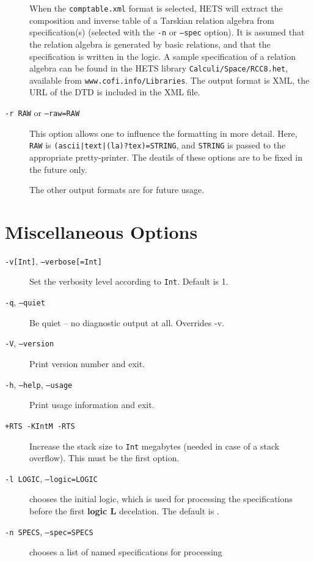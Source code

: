 \documentclass{article}
\newcommand{\normalTEXTSC}[2]{{#1\scriptsize#2}}
\newcommand     {\Hets}{\normalTEXTSC{H}{ETS}\xspace}
\begin{document}
\begin{description}
When the \texttt{comptable.xml} format is selected, \Hets will extract
the composition and inverse table of a Tarskian relation algebra from
specification(s) (selected with the \texttt{-n} or \texttt{--spec}
option). It is assumed that the relation algebra is
generated by basic relations, and that the specification is written
in the \CASL logic. A sample specification of a relation
algebra can be found in the \Hets library \texttt{Calculi/Space/RCC8.het},
available from \texttt{www.cofi.info/Libraries}.
The output format is XML, the URL of the DTD is included in the
XML file.

\item[\texttt{-r RAW} or \texttt{--raw=RAW}] This option  allows one
to influence the formatting in more detail.
Here, \texttt{RAW} is \texttt{(ascii|text|(la)?tex)=STRING},
and \texttt{STRING} is passed to the appropriate pretty-printer.
The deatils of these options are to be fixed in the future only.

The other output formats are for future usage.
\end{description}

\section{Miscellaneous Options}

\begin{description}
\item[\texttt{-v[Int]}, \texttt{--verbose[=Int]}] 
Set the verbosity level according to \texttt{Int}. Default is 1.
\item[\texttt{-q}, \texttt{--quiet}] 
Be quiet -- no diagnostic output at all. Overrides -v.
\item[\texttt{-V}, \texttt{--version}] Print version number and exit.
\item[\texttt{-h}, \texttt{--help}, \texttt{--usage}]  
Print usage information and exit.
\item[\texttt{+RTS -KIntM -RTS}] Increase the stack size to 
 \texttt{Int} megabytes (needed in case of a stack overflow). 
This must be the first option.
\item[\texttt{-l LOGIC}, \texttt{--logic=LOGIC}] chooses the initial logic, which is used for processing the specifications before the first \textbf{logic L}
decelation. The default is \CASL.
\item[\texttt{-n SPECS}, \texttt{--spec=SPECS}] 
chooses a list of named specifications for processing
\end{description}
\end{document}
